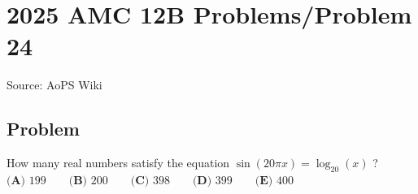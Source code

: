 \documentclass[12pt]{article}
\begin{document}
\section*{{2025 AMC 12B Problems/Problem 24}}
Source: AoPS Wiki

\subsection*{Problem}
How many real numbers satisfy the equation $\sin(20\pi x) = \log_{20}(x)$ ? $\textbf{(A) } 199 \qquad \textbf{(B) } 200 \qquad \textbf{(C) } 398 \qquad \textbf{(D) } 399 \qquad \textbf{(E) } 400$
\end{document}
